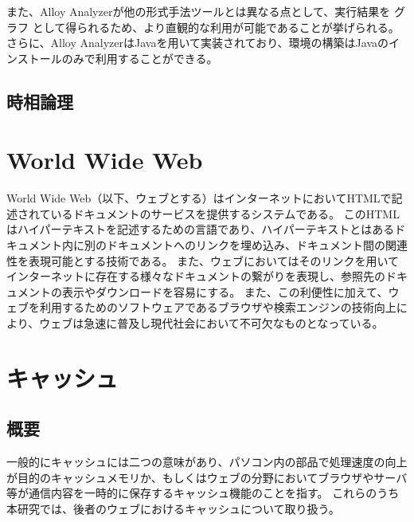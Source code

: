 \documentclass[12pt,a4paper]{jbook}
\begin{document}
また、Alloy Analyzerが他の形式手法ツールとは異なる点として、実行結果を
\color{red}
グラフ
\color{black}
として得られるため、より直観的な利用が可能であることが挙げられる。
さらに、Alloy AnalyzerはJavaを用いて実装されており、環境の構築はJavaのインストールのみで利用することができる。

\subsection{時相論理}
\label{sec:TemporalLogic}






\color{red}
\section{World Wide Web}
World Wide Web（以下、ウェブとする）はインターネットにおいてHTMLで記述されているドキュメントのサービスを提供するシステムである。
このHTMLはハイパーテキストを記述するための言語であり、ハイパーテキストとはあるドキュメント内に別のドキュメントへのリンクを埋め込み、ドキュメント間の関連性を表現可能とする技術である。
また、ウェブにおいてはそのリンクを用いてインターネットに存在する様々なドキュメントの繋がりを表現し、参照先のドキュメントの表示やダウンロードを容易にする。
また、この利便性に加えて、ウェブを利用するためのソフトウェアであるブラウザや検索エンジンの技術向上により、ウェブは急速に普及し現代社会において不可欠なものとなっている。
\color{black}

\section{キャッシュ}
\subsection{概要}
一般的にキャッシュには二つの意味があり、パソコン内の部品で処理速度の向上が目的のキャッシュメモリか、もしくはウェブの分野においてブラウザやサーバ等が通信内容を一時的に保存するキャッシュ機能のことを指す。
これらのうち本研究では、後者のウェブにおけるキャッシュについて取り扱う。
\end{document}
